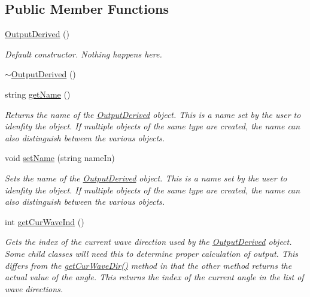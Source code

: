 \subsection*{Public Member Functions}
\begin{DoxyCompactItemize}
\item 
\hypertarget{class_output_derived_af8b70b70b8a5089f2b673da8b59a7b6a}{\hyperlink{class_output_derived_af8b70b70b8a5089f2b673da8b59a7b6a}{Output\-Derived} ()}\label{class_output_derived_af8b70b70b8a5089f2b673da8b59a7b6a}

\begin{DoxyCompactList}\small\item\em Default constructor. Nothing happens here. \end{DoxyCompactList}\item 
\hyperlink{class_output_derived_a4dde733443e52964c74d8bb6477f85f7}{$\sim$\-Output\-Derived} ()
\item 
string \hyperlink{class_output_derived_a31aeafb442ffc032f4e3e8a48285ebef}{get\-Name} ()
\begin{DoxyCompactList}\small\item\em Returns the name of the \hyperlink{class_output_derived}{Output\-Derived} object. This is a name set by the user to idenfity the object. If multiple objects of the same type are created, the name can also distinguish between the various objects. \end{DoxyCompactList}\item 
void \hyperlink{class_output_derived_a617d5070230751c908a1b261072e3672}{set\-Name} (string name\-In)
\begin{DoxyCompactList}\small\item\em Sets the name of the \hyperlink{class_output_derived}{Output\-Derived} object. This is a name set by the user to idenfity the object. If multiple objects of the same type are created, the name can also distinguish between the various objects. \end{DoxyCompactList}\item 
int \hyperlink{class_output_derived_ad4bb95c9693b2f34a40eb0136f2a13f4}{get\-Cur\-Wave\-Ind} ()
\begin{DoxyCompactList}\small\item\em Gets the index of the current wave direction used by the \hyperlink{class_output_derived}{Output\-Derived} object. Some child classes will need this to determine proper calculation of output. This differs from the \hyperlink{class_output_derived_ad59fff8dc8f1772039aff4950a3cdf18}{get\-Cur\-Wave\-Dir()} method in that the other method returns the actual value of the angle. This returns the index of the current angle in the list of wave directions. \end{DoxyCompactList}\item 

\end{DoxyCompactItemize}
